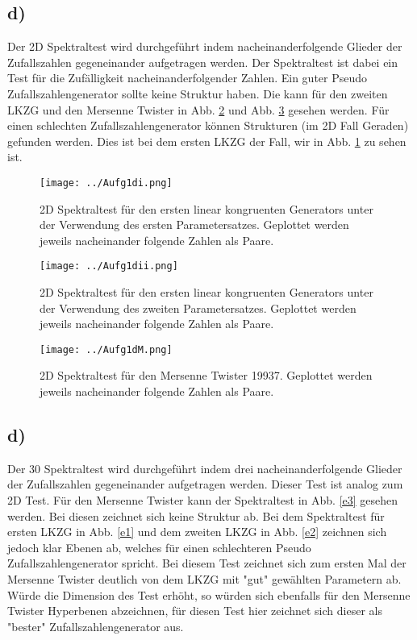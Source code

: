 \subsection*{d)}
Der 2D Spektraltest wird durchgeführt indem nacheinanderfolgende Glieder der Zufallszahlen gegeneinander aufgetragen werden.
Der Spektraltest ist dabei ein Test für die Zufälligkeit nacheinanderfolgender Zahlen.
Ein guter Pseudo Zufallszahlengenerator sollte keine Struktur haben.
Die kann für den zweiten LKZG und den Mersenne Twister in Abb. \ref{d2} und Abb. \ref{d3} gesehen werden.
Für einen schlechten Zufallszahlengenerator können Strukturen (im 2D Fall Geraden) gefunden werden.
Dies ist bei dem ersten LKZG der Fall, wir in Abb. \ref{d1} zu sehen ist.
\begin{figure}
	\centering
	\texttt{[image: ../Aufg1di.png]}
	\caption{2D Spektraltest für den ersten linear kongruenten Generators unter der Verwendung des ersten Parametersatzes. Geplottet werden jeweils nacheinander folgende Zahlen als Paare.}
	\label{d1}
\end{figure}

\begin{figure}
	\centering
	\texttt{[image: ../Aufg1dii.png]}
	\caption{2D Spektraltest für den ersten linear kongruenten Generators unter der Verwendung des zweiten Parametersatzes. Geplottet werden jeweils nacheinander folgende Zahlen als Paare.}
	\label{d2}
\end{figure}

\begin{figure}
	\centering
	\texttt{[image: ../Aufg1dM.png]}
	\caption{2D Spektraltest für den Mersenne Twister 19937. Geplottet werden jeweils nacheinander folgende Zahlen als Paare.}
	\label{d3}
\end{figure}
\FloatBarrier
\subsection*{d)}
Der 30 Spektraltest wird durchgeführt indem drei nacheinanderfolgende Glieder der Zufallszahlen gegeneinander aufgetragen werden.
Dieser Test ist analog zum 2D Test.
Für den Mersenne Twister kann der Spektraltest in Abb. \ref{e3} gesehen werden.
Bei diesen zeichnet sich keine Struktur ab.
Bei dem Spektraltest für ersten LKZG in Abb. \ref{e1} und dem zweiten LKZG in Abb. \ref{e2} zeichnen sich jedoch klar Ebenen ab, welches für einen schlechteren Pseudo Zufallszahlengenerator spricht.
Bei diesem Test zeichnet sich zum ersten Mal der Mersenne Twister deutlich von dem LKZG mit "gut" gewählten Parametern ab.
Würde die Dimension des Test erhöht, so würden sich ebenfalls für den Mersenne Twister Hyperbenen abzeichnen, für diesen Test hier zeichnet sich dieser als "bester" Zufallszahlengenerator aus.


